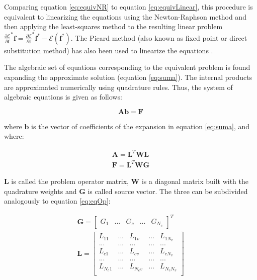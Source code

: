 \documentclass{CFD2011}
\begin{document}
Comparing equation \ref{eq:equivNR} to equation \ref{eq:equivLinear}, this procedure is equivalent to linearizing the equations using the Newton-Raphson method and then applying the least-squares method to the resulting linear problem $ \frac{\partial \mathcal{E}}{\partial \mathbf{f}}^*\mathbf{f}=\frac{\partial \mathcal{E}}{\partial \mathbf{f}}^*\mathbf{f^*}-\mathcal{E}(\mathbf{f^*})$. The Picard method (also known as fixed point or direct substitution method) has also been used to linearize the equations \cite{Sporleder2010}.

The algebraic set of equations corresponding to the equivalent problem is found expanding the approximate solution (equation \ref{eq:suma}). The internal products are approximated numerically using quadrature rules. Thus, the system of algebraic equations is given as follows:

\begin{equation}
\mathbf{A} \mathbf{b} = \mathbf{F}
\end{equation}

\noindent where $\mathbf{b}$ is the vector of coefficients of the expansion in equation \ref{eq:suma}, and where:

\begin{eqnarray}
\mathbf{A}=\mathbf{L}^T\mathbf{W}\mathbf{L} \nonumber \\
\mathbf{F}=\mathbf{L}^T\mathbf{W}\mathbf{G} \nonumber
\end{eqnarray}

$\mathbf{L}$ is called the problem operator matrix, $\mathbf{W}$ is a diagonal matrix built with the quadrature weights and $\mathbf{G}$ is called source vector. The three can be subdivided analogously to equation \ref{eq:eqOp}:

\begin{eqnarray}
\mathbf{G}=\left[ \begin{array}{ccccc} G_1 & ... & G_{c} & ... & G_{N_c} \end{array} \right]^T \nonumber\\
\mathbf{L}=\left[ \begin{array}{ccccc}
L_{11} & ... & L_{1v} & ... & L_{1N_v} \\
... & ... & ... & ... & ... \\
L_{c1} & ... & L_{cv} & ... & L_{cN_v} \\
... & ... & ... & ... & ... \\
L_{N_c1} & ... & L_{N_cv} & ... & L_{N_cN_v} \\
\end{array} \right] 
\end{eqnarray}
\end{document}
